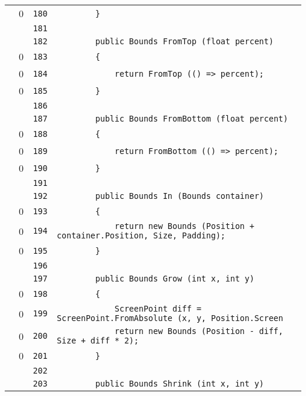\documentclass[a4paper,10pt]{article}
\begin{document}
\begin{longtable}[l]{lrrl}
\cellcolor{red} & 0 & \verb~180~ & \verb~        }~\\
\cellcolor{gray} &  & \verb~181~ & \verb~~\\
\cellcolor{gray} &  & \verb~182~ & \verb~        public Bounds FromTop (float percent)~\\
\cellcolor{red} & 0 & \verb~183~ & \verb~        {~\\
\cellcolor{red} & 0 & \verb~184~ & \verb~            return FromTop (() => percent);~\\
\cellcolor{red} & 0 & \verb~185~ & \verb~        }~\\
\cellcolor{gray} &  & \verb~186~ & \verb~~\\
\cellcolor{gray} &  & \verb~187~ & \verb~        public Bounds FromBottom (float percent)~\\
\cellcolor{red} & 0 & \verb~188~ & \verb~        {~\\
\cellcolor{red} & 0 & \verb~189~ & \verb~            return FromBottom (() => percent);~\\
\cellcolor{red} & 0 & \verb~190~ & \verb~        }~\\
\cellcolor{gray} &  & \verb~191~ & \verb~~\\
\cellcolor{gray} &  & \verb~192~ & \verb~        public Bounds In (Bounds container)~\\
\cellcolor{red} & 0 & \verb~193~ & \verb~        {~\\
\cellcolor{red} & 0 & \verb~194~ & \verb~            return new Bounds (Position + container.Position, Size, Padding);~\\
\cellcolor{red} & 0 & \verb~195~ & \verb~        }~\\
\cellcolor{gray} &  & \verb~196~ & \verb~~\\
\cellcolor{gray} &  & \verb~197~ & \verb~        public Bounds Grow (int x, int y)~\\
\cellcolor{red} & 0 & \verb~198~ & \verb~        {~\\
\cellcolor{red} & 0 & \verb~199~ & \verb~            ScreenPoint diff = ScreenPoint.FromAbsolute (x, y, Position.Screen~\\
\cellcolor{red} & 0 & \verb~200~ & \verb~            return new Bounds (Position - diff, Size + diff * 2);~\\
\cellcolor{red} & 0 & \verb~201~ & \verb~        }~\\
\cellcolor{gray} &  & \verb~202~ & \verb~~\\
\cellcolor{gray} &  & \verb~203~ & \verb~        public Bounds Shrink (int x, int y)~\\

\end{longtable}
\end{document}
